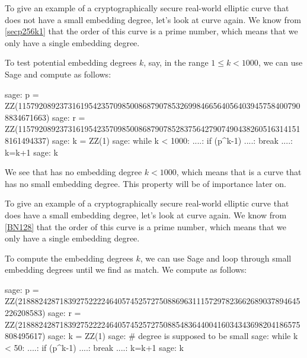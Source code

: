 \begin{example}
\label{ex:pairings_on_secp256k1}
 To give an example of a cryptographically secure real-world elliptic curve that does not have a small embedding degree, let's look at curve  again. We know from \examplename{} \ref{secp256k1} that the order of this curve is a prime number, which means that we only have a single embedding degree.

To test potential embedding degrees $k$, say, in the range $1\leq k < 1000$, we can use Sage and compute as follows:
\begin{sagecommandline}
sage: p = ZZ(115792089237316195423570985008687907853269984665640564039457584007908834671663)
sage: r = ZZ(115792089237316195423570985008687907852837564279074904382605163141518161494337)
sage: k = ZZ(1)
sage: while k < 1000:
....:     if (p^k-1)%
....:         break
....:     k=k+1
sage: k
\end{sagecommandline}
We see that  has no embedding degree $k<1000$, which means that   is a curve that has no small embedding degree. This property will be of importance later on.
\end{example}
\begin{example}
\label{ex:embedding_degre_BN128}
To give an example of a cryptographically secure real-world elliptic curve that does have a small embedding degree, let's look at curve  again. We know from \examplename{} \ref{BN128} that the order of this curve is a prime number, which means that we only have a single embedding degree.

To compute the embedding degrees $k$, we can use Sage and loop through small embedding degrees until we find as match. We compute as follows:
\begin{sagecommandline}
sage: p = ZZ(21888242871839275222246405745257275088696311157297823662689037894645226208583)
sage: r = ZZ(21888242871839275222246405745257275088548364400416034343698204186575808495617)
sage: k = ZZ(1)
sage: # degree is supposed to be small
sage: while k < 50: 
....:     if (p^k-1)%
....:         break
....:     k=k+1
sage: k
\end{sagecommandline}
\end{example}



